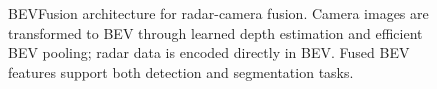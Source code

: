 \begin{figure}[t]
\caption{BEVFusion architecture for radar-camera fusion. Camera images are transformed to BEV through learned depth estimation and efficient BEV pooling; radar data is encoded directly in BEV. Fused BEV features support both detection and segmentation tasks.}
\label{fig:bevfusion_arch}
\end{figure}
